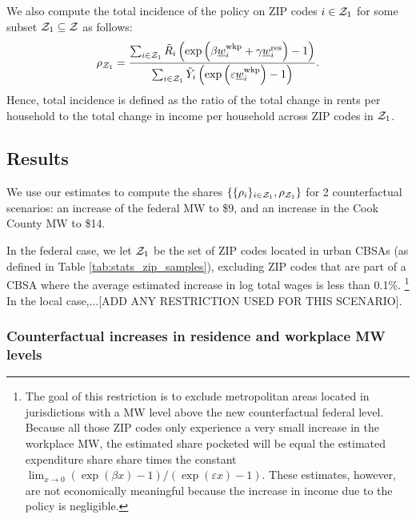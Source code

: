 We also compute the total incidence of the policy on ZIP codes $i\in\mathcal{Z}_1$
for some subset $\mathcal{Z}_1\subseteq\mathcal{Z}$ as follows:
\begin{equation}\label{eq:tot_incidence}
    \rho_{\mathcal{Z}_1} = 
        \frac{\sum_{i\in\mathcal{Z}_1} \tilde R_i \left(\exp \left( \beta \underline{w}_i^{\text{wkp}} 
                                    + \gamma \underline{w}_i^{\text{res}} \right) - 1\right) }
            {\sum_{i\in\mathcal{Z}_1} \tilde Y_i \left( \exp \left( \varepsilon \underline{w}_i^{\text{wkp}} \right) 
                                    - 1\right) } .
\end{equation}
Hence, total incidence is defined as the ratio of the total change in rents
per household to the total change in income per household across ZIP codes 
in $\mathcal{Z}_1$.

\subsection{Results}\label{sec:results_cf}

We use our estimates to compute the shares 
$\{\{\rho_i\}_{i\in\mathcal{Z}_1},\rho_{\mathcal{Z}_1}\}$ for 2 counterfactual scenarios:
an increase of the federal MW to \$9, and 
an increase in the Cook County MW to \$14.

In the federal case, we let $\mathcal{Z}_1$ be the set of ZIP codes located in urban 
CBSAs (as defined in Table \ref{tab:stats_zip_samples}), excluding ZIP codes 
that are part of a CBSA where the average estimated increase in log total wages 
is less than 0.1\%.%
\footnote{\label{foot:restriction_on_zipcodes}
The goal of this restriction is to exclude metropolitan areas located 
in jurisdictions with a MW level above the new counterfactual federal level.
Because all those ZIP codes only experience a very small increase in the 
workplace MW, the estimated share pocketed will be equal the estimated
expenditure share share times the constant 
$\lim_{x\to 0} \left(\exp(\beta x)-1\right)/\left(\exp(\varepsilon x)-1\right)$.
These estimates, however, are not economically meaningful because the increase
in income due to the policy is negligible.}
In the local case,...[ADD ANY RESTRICTION USED FOR THIS SCENARIO].

\subsubsection*{Counterfactual increases in residence and workplace MW levels}
\label{sec:cf_res_and_wkp_changes}

